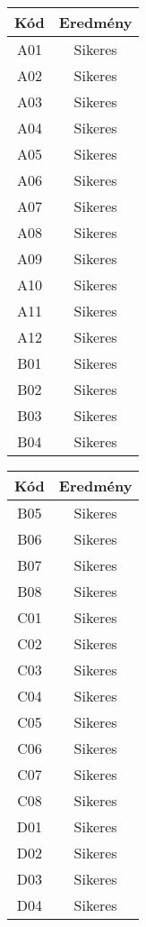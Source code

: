 \begin{table}[H]
	\centering
	\begin{tabular}{|c|c|}
		\hline
		\textbf{Kód} & \textbf{Eredmény} \\
		\hline
		A01 & Sikeres \\
		\hline
		A02 & Sikeres \\
		\hline
		A03 & Sikeres \\
		\hline
		A04 & Sikeres \\
		\hline
		A05 & Sikeres \\
		\hline
		A06 & Sikeres \\
		\hline
		A07 & Sikeres \\
		\hline
		A08 & Sikeres \\
		\hline
		A09 & Sikeres \\
		\hline
		A10 & Sikeres \\
		\hline
		A11 & Sikeres \\
		\hline
		A12 & Sikeres \\
		\hline
		B01 & Sikeres \\
		\hline
		B02 & Sikeres \\
		\hline
		B03 & Sikeres \\
		\hline
		B04 & Sikeres \\
		\hline
	\end{tabular}
	\begin{tabular}{|c|c|}
		\hline
		\textbf{Kód} & \textbf{Eredmény} \\
		\hline
		B05 & Sikeres \\
		\hline
		B06 & Sikeres \\
		\hline
		B07 & Sikeres \\
		\hline
		B08 & Sikeres \\
		\hline
		C01 & Sikeres \\
		\hline
		C02 & Sikeres \\
		\hline
		C03 & Sikeres \\
		\hline
		C04 & Sikeres \\
		\hline
		C05 & Sikeres \\
		\hline
		C06 & Sikeres \\
		\hline
		C07 & Sikeres \\
		\hline
		C08 & Sikeres \\
		\hline
		D01 & Sikeres \\
		\hline
		D02 & Sikeres \\
		\hline
		D03 & Sikeres \\
		\hline
		D04 & Sikeres \\

\end{tabular}
\end{table}
